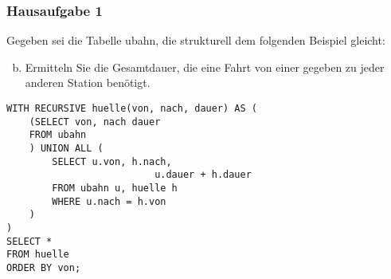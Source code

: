 \begin{frame}[fragile]
\frametitle{Hausaufgabe 1}
\vspace{0.25cm}

\begin{multicols}{2}
	Gegeben sei die Tabelle ubahn, die strukturell dem folgenden Beispiel gleicht:
	\begin{enumerate}[a)]
		\setcounter{enumi}{1}
		\item Ermitteln Sie die Gesamtdauer, die eine Fahrt von
		      einer gegeben zu jeder anderen Station benötigt.


	\end{enumerate}
	\vfill\columnbreak

	\begin{verbatim}
WITH RECURSIVE huelle(von, nach, dauer) AS (
	(SELECT von, nach dauer
	FROM ubahn
	) UNION ALL (
		SELECT u.von, h.nach,
		                  u.dauer + h.dauer
		FROM ubahn u, huelle h
		WHERE u.nach = h.von
	)
)
SELECT *
FROM huelle 
ORDER BY von;
	\end{verbatim}
\end{multicols}
\end{frame}

